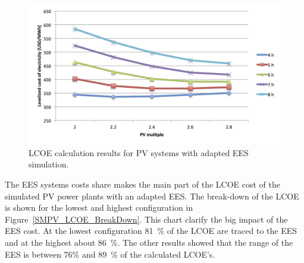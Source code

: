 \begin{figure}[htbp]  
\centering
\includegraphics[width=1\linewidth]{FIG/PV_LCOE}
\caption[LCOE calculation results for PV systems with adapted EES simulation.]{LCOE calculation results for PV systems with adapted EES simulation.}\label{PV_LCOE}
\end{figure}
The EES systems costs share makes the main part of the LCOE cost of the simulated PV power plants with an adapted EES. The break-down of the LCOE is shown for the lowest and highest configuration in Figure~\ref{SMPV_LCOE_BreakDown}. This chart clarify the big impact of the EES cost. At the lowest configuration 81~\% of the LCOE are traced to the EES and at the highest about 86~\%. The other results showed that the range of the EES is between 76\% and 89~\% of the calculated LCOE's.

